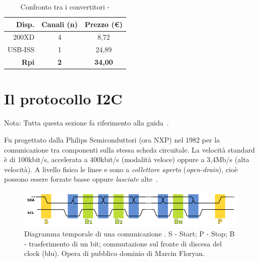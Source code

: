 	\begin{table}
		\begin{center}
		\caption{Confronto tra i convertitori \iic-\usb}
		\label{tab:convertitori}
		\begin{tabular}{r c c}
Disp.        & Canali (n)  & Prezzo (\euro)\\
			\hline
200XD        &  4          & 8,72\\
USB-ISS      &  1          & 24,89\\
\textbf{Rpi} &  \textbf{2} & \textbf{34,00}\\
			\hline
		\end{tabular}
		\end{center}
	\end{table}

% 

\section{Il protocollo I2C} \label{sez:protocollo_i2c}
{Nota: Tutta questa sezione fa riferimento alla guida~\cite{cit:primer}.}

    Fu progettato dalla Philips Semiconduttori (ora NXP) nel 1982
    per la comunicazione tra componenti sulla stessa scheda circuitale.
    La velocità standard è di 100kbit/s,
    accelerata a 400kbit/s (modalità veloce)
    oppure a 3,4Mb/s (alta velocità).
    A livello fisico le linee \sda{} e \scl{} sono a \emph{collettore aperto}
    (\textit{open-drain}),
    cioè possono essere forzate basse oppure \emph{lasciate} alte~\cite{cit:primer}.
	
\begin{figure}[t]
	\centering
	\includegraphics[scale=.3]{I2C_data_transfer}
    \caption{Diagramma temporale di una comunicazione \iic{}. S - Start; P - Stop; B - trasferimento di un bit; commutazione sul fronte di discesa del clock (blu). Opera di pubblico dominio di Marcin Floryan.}
    \label{fig:i2c_trans}
\end{figure}



